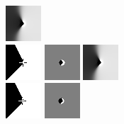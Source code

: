 \begin{figure}[h]
    \includegraphics[width=0.2\linewidth]{../Images/disctest/flatcorner2inpaint.png}\\
    \vspace*{0.2cm}
    \includegraphics[width=0.2\linewidth]{../Images/disctest/flatcorner3.png}\hspace{0.2cm}
    \includegraphics[width=0.2\linewidth]{../Images/disctest/flatcorner3mask.png}\hspace{0.2cm}
    \includegraphics[width=0.2\linewidth]{../Images/disctest/flatcorner3inpaint.png}\\
    \vspace*{0.2cm}
    \includegraphics[width=0.2\linewidth]{../Images/disctest/flatcorner4.png}\hspace{0.2cm}
    \includegraphics[width=0.2\linewidth]{../Images/disctest/flatcorner4mask.png}\hspace{0.2cm}

\end{figure}

